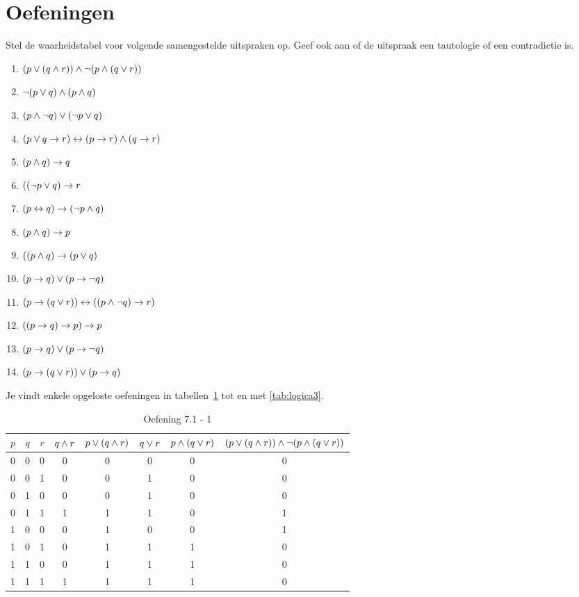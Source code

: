 \section{Oefeningen}
\begin{oef}
Stel de waarheidstabel voor volgende samengestelde uitspraken op. Geef ook aan of de uitspraak een tautologie of een contradictie is.
\begin{enumerate}
  \item $(p \vee (q \wedge r)) \wedge \neg(p \wedge (q \vee r))$
  \item $\neg(p \vee q) \wedge (p \wedge q)$
  \item $(p \wedge \neg q) \vee (\neg p \vee q)$
  \item $(p \vee q \rightarrow r) \leftrightarrow (p\rightarrow r) \wedge (q\rightarrow r)$
  \item $(p\wedge q)\rightarrow q$
  \item $((\neg p \vee q)\rightarrow r$
  \item $(p\leftrightarrow q)\rightarrow (\neg p \wedge q)$
  \item $(p\wedge q)\rightarrow p$
  \item $((p\wedge q)\rightarrow (p \vee q)$
  \item $(p \rightarrow q) \vee(p\rightarrow \neg q)$
  \item $(p\rightarrow(q\vee r))\leftrightarrow((p\wedge \neg q)\rightarrow r)$
  \item $((p\rightarrow q)\rightarrow p)\rightarrow p$
  \item $(p \rightarrow q)\vee (p \rightarrow \neg q)$
  \item $(p\rightarrow(q\vee r))\vee(p\rightarrow q)$
\end{enumerate}
\begin{opl}
Je vindt enkele opgeloste oefeningen in tabellen~\ref{tab:logica1} tot en met \ref{tab:logica3}.
\begin{table}[htbp]\footnotesize
  \centering
  \caption{Oefening 7.1 - 1}
  \begin{tabular}{cccccccc}
    \toprule 
    $p$ & $q$ & $r$ & $q\wedge r$ & $p\vee (q\wedge r)$ & $q\vee r$ & $p\wedge (q\vee r)$ & $(p\vee (q\wedge r))\wedge \neg(p\wedge (q\vee r))$ \\ 
    \midrule
    0 & 0 & 0 & 0 & 0 & 0 & 0 & 0 \\ 
    0 & 0 & 1 & 0 & 0 & 1 & 0 & 0 \\ 
    0 & 1 & 0 & 0 & 0 & 1 & 0 & 0 \\ 
    0 & 1 & 1 & 1 & 1 & 1 & 0 & 1 \\  
    1 & 0 & 0 & 0 & 1 & 0 & 0 & 1 \\ 
    1 & 0 & 1 & 0 & 1 & 1 & 1 & 0 \\  
    1 & 1 & 0 & 0 & 1 & 1 & 1 & 0 \\ 
    1 & 1 & 1 & 1 & 1 & 1 & 1 & 0 \\ 
    \bottomrule 
  \end{tabular} 
  \label{tab:logica1}
\end{table}


\end{opl}
\end{oef}
